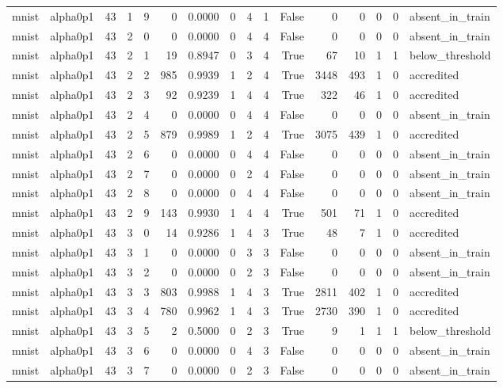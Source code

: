 \begin{tabular}{llrrrrrrrrrrrrrl}
mnist & alpha0p1 & 43 & 1 & 9 & 0 & 0.0000 & 0 & 4 & 1 & False & 0 & 0 & 0 & 0 & absent\_in\_train \\
mnist & alpha0p1 & 43 & 2 & 0 & 0 & 0.0000 & 0 & 4 & 4 & False & 0 & 0 & 0 & 0 & absent\_in\_train \\
mnist & alpha0p1 & 43 & 2 & 1 & 19 & 0.8947 & 0 & 3 & 4 & True & 67 & 10 & 1 & 1 & below\_threshold \\
mnist & alpha0p1 & 43 & 2 & 2 & 985 & 0.9939 & 1 & 2 & 4 & True & 3448 & 493 & 1 & 0 & accredited \\
mnist & alpha0p1 & 43 & 2 & 3 & 92 & 0.9239 & 1 & 4 & 4 & True & 322 & 46 & 1 & 0 & accredited \\
mnist & alpha0p1 & 43 & 2 & 4 & 0 & 0.0000 & 0 & 4 & 4 & False & 0 & 0 & 0 & 0 & absent\_in\_train \\
mnist & alpha0p1 & 43 & 2 & 5 & 879 & 0.9989 & 1 & 2 & 4 & True & 3075 & 439 & 1 & 0 & accredited \\
mnist & alpha0p1 & 43 & 2 & 6 & 0 & 0.0000 & 0 & 4 & 4 & False & 0 & 0 & 0 & 0 & absent\_in\_train \\
mnist & alpha0p1 & 43 & 2 & 7 & 0 & 0.0000 & 0 & 2 & 4 & False & 0 & 0 & 0 & 0 & absent\_in\_train \\
mnist & alpha0p1 & 43 & 2 & 8 & 0 & 0.0000 & 0 & 4 & 4 & False & 0 & 0 & 0 & 0 & absent\_in\_train \\
mnist & alpha0p1 & 43 & 2 & 9 & 143 & 0.9930 & 1 & 4 & 4 & True & 501 & 71 & 1 & 0 & accredited \\
mnist & alpha0p1 & 43 & 3 & 0 & 14 & 0.9286 & 1 & 4 & 3 & True & 48 & 7 & 1 & 0 & accredited \\
mnist & alpha0p1 & 43 & 3 & 1 & 0 & 0.0000 & 0 & 3 & 3 & False & 0 & 0 & 0 & 0 & absent\_in\_train \\
mnist & alpha0p1 & 43 & 3 & 2 & 0 & 0.0000 & 0 & 2 & 3 & False & 0 & 0 & 0 & 0 & absent\_in\_train \\
mnist & alpha0p1 & 43 & 3 & 3 & 803 & 0.9988 & 1 & 4 & 3 & True & 2811 & 402 & 1 & 0 & accredited \\
mnist & alpha0p1 & 43 & 3 & 4 & 780 & 0.9962 & 1 & 4 & 3 & True & 2730 & 390 & 1 & 0 & accredited \\
mnist & alpha0p1 & 43 & 3 & 5 & 2 & 0.5000 & 0 & 2 & 3 & True & 9 & 1 & 1 & 1 & below\_threshold \\
mnist & alpha0p1 & 43 & 3 & 6 & 0 & 0.0000 & 0 & 4 & 3 & False & 0 & 0 & 0 & 0 & absent\_in\_train \\
mnist & alpha0p1 & 43 & 3 & 7 & 0 & 0.0000 & 0 & 2 & 3 & False & 0 & 0 & 0 & 0 & absent\_in\_train \\

\end{tabular}
